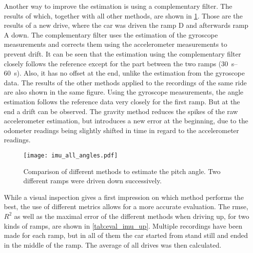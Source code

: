 Another way to improve the estimation is using a complementary filter.
The results of which, together with all other methods, are shown in \cref{fig:imu_all_angles}.
Those are the results of a new drive, where the car was driven the ramp D and afterwards ramp A down.
The complementary filter uses the estimation of the gyroscope measurements and corrects them using the accelerometer measurements to prevent drift.
It can be seen that the estimation using the complementary filter closely follows the reference except for the part between the two ramps (\SIrange{30}{60}{\second}).
Also, it has no offset at the end, unlike the estimation from the gyroscope data.
The results of the other methods applied to the recordings of the same ride are also shown in the same figure.
Using the gyroscope measurements, the angle estimation follows the reference data very closely for the first ramp.
But at the end a drift can be observed.
The gravity method reduces the spikes of the raw accelerometer estimation, but introduces a new error at the beginning, due to the odometer readings being slightly shifted in time in regard to the accelerometer readings.
\begin{figure}[h]
    \centering
    \texttt{[image: imu\_all\_angles.pdf]}
    \caption[ angle estimation comparison of all methods]{Comparison of different methods to estimate the pitch angle. Two different ramps were driven down successively.}
    \label{fig:imu_all_angles}
\end{figure}

While a visual inspection gives a first impression on which method performs the best, the use of different metrics allows for a more accurate evaluation.
The \gls{rmse}, $R^2$ as well as the maximal error of the different methods when driving up, for two kinds of ramps, are shown in \cref{tab:eval_imu_up}.
Multiple recordings have been made for each ramp, but in all of them the car started from stand still and ended in the middle of the ramp.
The average of all drives was then calculated.


